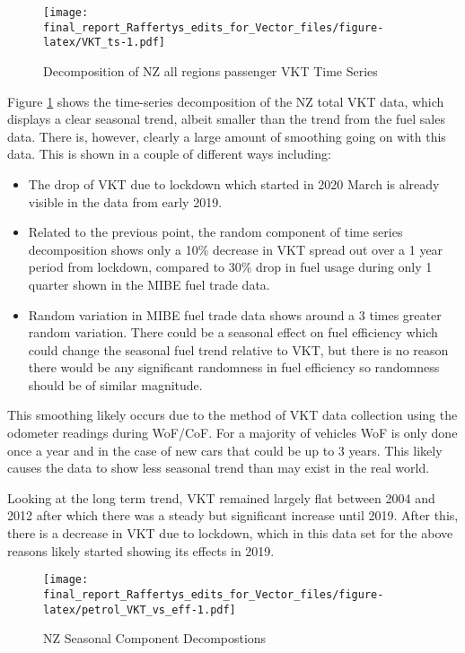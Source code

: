 \documentclass[
]{article}
\begin{document}
\begin{figure}
\centering
\texttt{[image: final\_report\_Raffertys\_edits\_for\_Vector\_files/figure-latex/VKT\_ts-1.pdf]}
\caption{Decomposition of NZ all regions passenger VKT Time
Series\label{fig:VKT_ts}}
\end{figure}

Figure \ref{fig:VKT_ts} shows the time-series decomposition of the NZ
total VKT data, which displays a clear seasonal trend, albeit smaller
than the trend from the fuel sales data. There is, however, clearly a
large amount of smoothing going on with this data. This is shown in a
couple of different ways including:

\begin{itemize}
\item The drop of VKT due to lockdown which started in 2020 March is already visible in the data from early 2019. 
\item Related to the previous point, the random component of time series decomposition shows only a 10\% decrease in VKT spread out over a 1 year period from lockdown, compared to 30\% drop in fuel usage during only 1 quarter shown in the MIBE fuel trade data. 
\item Random variation in MIBE fuel trade data shows around a 3 times greater random variation. There could be a seasonal effect on fuel efficiency which could change the seasonal fuel trend relative to VKT, but there is no reason there would be any significant randomness in fuel efficiency so randomness should be of similar magnitude.
\end{itemize}

This smoothing likely occurs due to the method of VKT data collection
using the odometer readings during WoF/CoF. For a majority of vehicles
WoF is only done once a year and in the case of new cars that could be
up to 3 years. This likely causes the data to show less seasonal trend
than may exist in the real world.

Looking at the long term trend, VKT remained largely flat between 2004
and 2012 after which there was a steady but significant increase until
2019. After this, there is a decrease in VKT due to lockdown, which in
this data set for the above reasons likely started showing its effects
in 2019.

\begin{figure}
\centering
\texttt{[image: final\_report\_Raffertys\_edits\_for\_Vector\_files/figure-latex/petrol\_VKT\_vs\_eff-1.pdf]}
\caption{NZ Seasonal Component Decompostions}
\end{figure}
\end{document}
